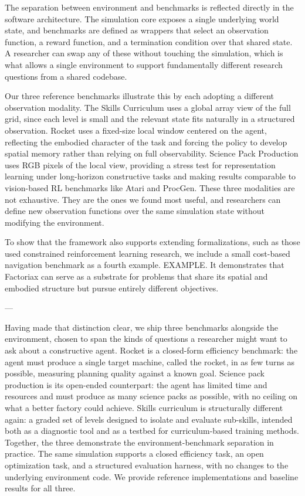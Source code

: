 \documentclass{article}
\begin{document}
The separation between environment and benchmarks is reflected directly in the software architecture.
The simulation core exposes a single underlying world state, and benchmarks are defined as wrappers that select an observation function, a reward function, and a termination condition over that shared state. 
A researcher can swap any of these without touching the simulation, which is what allows a single environment to support fundamentally different research questions from a shared codebase.

Our three reference benchmarks illustrate this by each adopting a different observation modality. 
The Skills Curriculum uses a global array view of the full grid, since each level is small and the relevant state fits naturally in a structured observation. 
Rocket uses a fixed-size local window centered on the agent, reflecting the embodied character of the task and forcing the policy to develop spatial memory rather than relying on full observability. 
Science Pack Production uses RGB pixels of the local view, providing a stress test for representation learning under long-horizon constructive tasks and making results comparable to vision-based RL benchmarks like Atari and ProcGen. 
These three modalities are not exhaustive. They are the ones we found most useful, and researchers can define new observation functions over the same simulation state without modifying the environment.

To show that the framework also supports extending formalizations, such as those used constrained reinforcement learning research, we include a small cost-based navigation benchmark as a fourth example.
EXAMPLE.  
It demonstrates that Factoriax can serve as a substrate for problems that share its spatial and embodied structure but pursue entirely different objectives.



---


Having made that distinction clear, we ship three benchmarks alongside the environment, chosen to span the kinds of questions a researcher might want to ask about a constructive agent. Rocket is a closed-form efficiency benchmark: the agent must produce a single target machine, called the rocket, in as few turns as possible, measuring planning quality against a known goal. Science pack production is its open-ended counterpart: the agent has limited time and resources and must produce as many science packs as possible, with no ceiling on what a better factory could achieve. Skills curriculum is structurally different again: a graded set of levels designed to isolate and evaluate sub-skills, intended both as a diagnostic tool and as a testbed for curriculum-based training methods. Together, the three demonstrate the environment-benchmark separation in practice. The same simulation supports a closed efficiency task, an open optimization task, and a structured evaluation harness, with no changes to the underlying environment code. We provide reference implementations and baseline results for all three.
\end{document}
